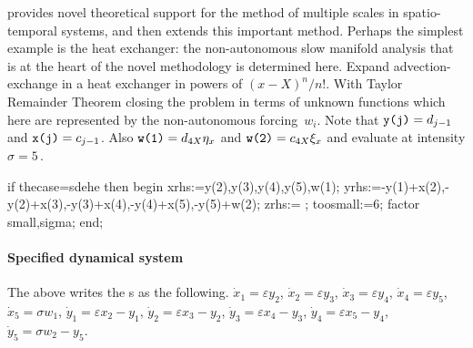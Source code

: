 \documentclass[11pt,a5paper]{article}
\begin{document}
\cite{Roberts2013a} provides novel theoretical support for the method of multiple scales in spatio-temporal systems, and then extends this important method.
Perhaps the simplest example is the heat exchanger: the non-autonomous slow manifold analysis that is at the heart of the novel methodology is determined here.
Expand advection-exchange in a heat exchanger in powers of $(x-X)^n/n!$.
With Taylor Remainder Theorem closing the problem in terms of unknown functions which here are represented by the non-autonomous forcing~$w_i$.
Note that \(\verb|y(j)|=d_{j-1}\) and \(\verb|x(j)|=c_{j-1}\).  
Also \(\verb|w(1)|=d_{4X}\eta_x\) and \(\verb|w(2)|=c_{4X}\xi_x\) and evaluate at intensity $\sigma=5$\,.
\begin{reduce}
if thecase=sdehe then begin
xrhs:={y(2),y(3),y(4),y(5),w(1)};
yrhs:={-y(1)+x(2),-y(2)+x(3),-y(3)+x(4),-y(4)+x(5),-y(5)+w(2)};
zrhs:={ };
toosmall:=6;
factor small,sigma;
end;
\end{reduce}


\paragraph{Specified dynamical system}
The above writes the \ode{}s as the following.
\begin{math}
\dot x_{1}=\varepsilon  y_{2}
\end{math},
\begin{math}
\dot x_{2}=\varepsilon  y_{3}
\end{math},
\begin{math}
\dot x_{3}=\varepsilon  y_{4}
\end{math},
\begin{math}
\dot x_{4}=\varepsilon  y_{5}
\end{math},
\begin{math}
\dot x_{5}=\sigma  w_{1}
\end{math},
\begin{math}
\dot y_{1}=\varepsilon  x_{2}-y_{1}
\end{math},
\begin{math}
\dot y_{2}=\varepsilon  x_{3}-y_{2}
\end{math},
\begin{math}
\dot y_{3}=\varepsilon  x_{4}-y_{3}
\end{math},
\begin{math}
\dot y_{4}=\varepsilon  x_{5}-y_{4}
\end{math},
\begin{math}
\dot y_{5}=\sigma  w_{2}-y_{5}
\end{math}.
\end{document}

